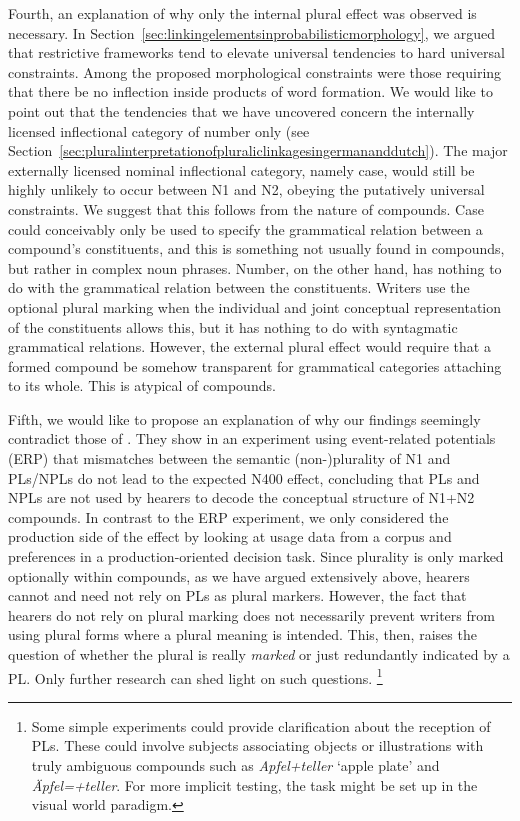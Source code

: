 Fourth, an explanation of why only the internal plural effect was observed is necessary.
In Section~\ref{sec:linkingelementsinprobabilisticmorphology}, we argued that restrictive frameworks tend to elevate universal tendencies to hard universal constraints.
Among the proposed morphological constraints were those requiring that there be no inflection inside products of word formation.
We would like to point out that the tendencies that we have uncovered concern the internally licensed inflectional category of number only (see Section~\ref{sec:pluralinterpretationofpluraliclinkagesingermananddutch}).
The major externally licensed nominal inflectional category, namely case, would still be highly unlikely to occur between N1 and N2, obeying the putatively universal constraints.
We suggest that this follows from the nature of compounds.
Case could conceivably only be used to specify the grammatical relation between a compound's constituents, and this is something not usually found in compounds, but rather in complex noun phrases.
Number, on the other hand, has nothing to do with the grammatical relation between the constituents.
Writers use the optional plural marking when the individual and joint conceptual representation of the constituents allows this, but it has nothing to do with syntagmatic grammatical relations.
However, the external plural effect would require that a formed compound be somehow transparent for grammatical categories attaching to its whole.
This is atypical of compounds.

Fifth, we would like to propose an explanation of why our findings seemingly contradict those of \textcite{KoesterEa2004}.
They show in an experiment using event-related potentials (ERP) that mismatches between the semantic (non-)plurality of N1 and PLs\slash NPLs do not lead to the expected N400 effect, concluding that PLs and NPLs are not used by hearers to decode the conceptual structure of N1+N2 compounds.
In contrast to the ERP experiment, we only considered the production side of the effect by looking at usage data from a corpus and preferences in a production-oriented decision task.
Since plurality is only marked optionally within compounds, as we have argued extensively above, hearers cannot and need not rely on PLs as plural markers.
However, the fact that hearers do not rely on plural marking does not necessarily prevent writers from using plural forms where a plural meaning is intended.
This, then, raises the question of whether the plural is really \textit{marked} or just redundantly indicated by a PL.
Only further research can shed light on such questions.%
\footnote{Some simple experiments could provide clarification about the reception of PLs.
These could involve subjects associating objects or illustrations with truly ambiguous compounds such as \textit{Apfel+teller} `apple plate' and \textit{Äpfel=+teller}.
For more implicit testing, the task might be set up in the visual world paradigm.}

